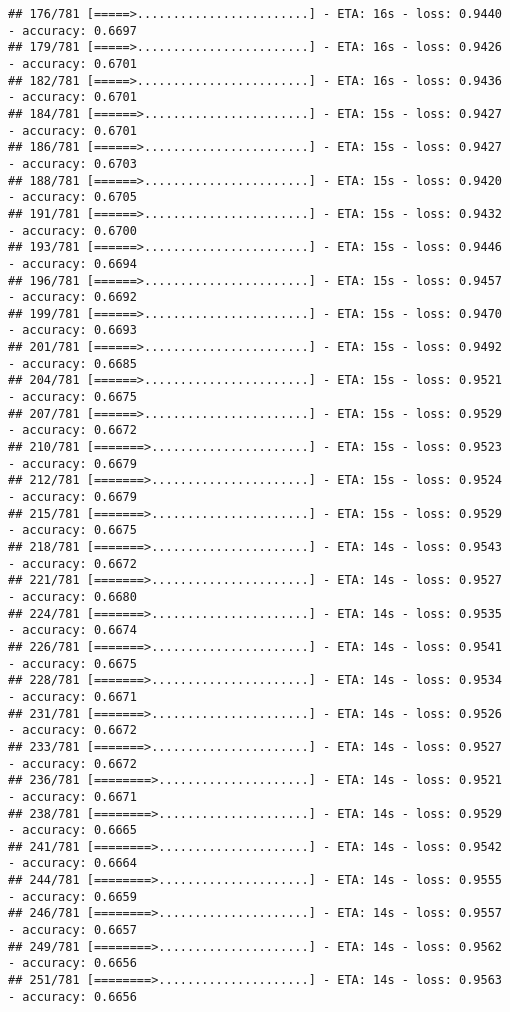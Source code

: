 \documentclass[
]{article}
\begin{document}
\begin{verbatim}
## 176/781 [=====>........................] - ETA: 16s - loss: 0.9440 - accuracy: 0.6697
## 179/781 [=====>........................] - ETA: 16s - loss: 0.9426 - accuracy: 0.6701
## 182/781 [=====>........................] - ETA: 16s - loss: 0.9436 - accuracy: 0.6701
## 184/781 [======>.......................] - ETA: 15s - loss: 0.9427 - accuracy: 0.6701
## 186/781 [======>.......................] - ETA: 15s - loss: 0.9427 - accuracy: 0.6703
## 188/781 [======>.......................] - ETA: 15s - loss: 0.9420 - accuracy: 0.6705
## 191/781 [======>.......................] - ETA: 15s - loss: 0.9432 - accuracy: 0.6700
## 193/781 [======>.......................] - ETA: 15s - loss: 0.9446 - accuracy: 0.6694
## 196/781 [======>.......................] - ETA: 15s - loss: 0.9457 - accuracy: 0.6692
## 199/781 [======>.......................] - ETA: 15s - loss: 0.9470 - accuracy: 0.6693
## 201/781 [======>.......................] - ETA: 15s - loss: 0.9492 - accuracy: 0.6685
## 204/781 [======>.......................] - ETA: 15s - loss: 0.9521 - accuracy: 0.6675
## 207/781 [======>.......................] - ETA: 15s - loss: 0.9529 - accuracy: 0.6672
## 210/781 [=======>......................] - ETA: 15s - loss: 0.9523 - accuracy: 0.6679
## 212/781 [=======>......................] - ETA: 15s - loss: 0.9524 - accuracy: 0.6679
## 215/781 [=======>......................] - ETA: 15s - loss: 0.9529 - accuracy: 0.6675
## 218/781 [=======>......................] - ETA: 14s - loss: 0.9543 - accuracy: 0.6672
## 221/781 [=======>......................] - ETA: 14s - loss: 0.9527 - accuracy: 0.6680
## 224/781 [=======>......................] - ETA: 14s - loss: 0.9535 - accuracy: 0.6674
## 226/781 [=======>......................] - ETA: 14s - loss: 0.9541 - accuracy: 0.6675
## 228/781 [=======>......................] - ETA: 14s - loss: 0.9534 - accuracy: 0.6671
## 231/781 [=======>......................] - ETA: 14s - loss: 0.9526 - accuracy: 0.6672
## 233/781 [=======>......................] - ETA: 14s - loss: 0.9527 - accuracy: 0.6672
## 236/781 [========>.....................] - ETA: 14s - loss: 0.9521 - accuracy: 0.6671
## 238/781 [========>.....................] - ETA: 14s - loss: 0.9529 - accuracy: 0.6665
## 241/781 [========>.....................] - ETA: 14s - loss: 0.9542 - accuracy: 0.6664
## 244/781 [========>.....................] - ETA: 14s - loss: 0.9555 - accuracy: 0.6659
## 246/781 [========>.....................] - ETA: 14s - loss: 0.9557 - accuracy: 0.6657
## 249/781 [========>.....................] - ETA: 14s - loss: 0.9562 - accuracy: 0.6656
## 251/781 [========>.....................] - ETA: 14s - loss: 0.9563 - accuracy: 0.6656

\end{verbatim}
\end{document}
